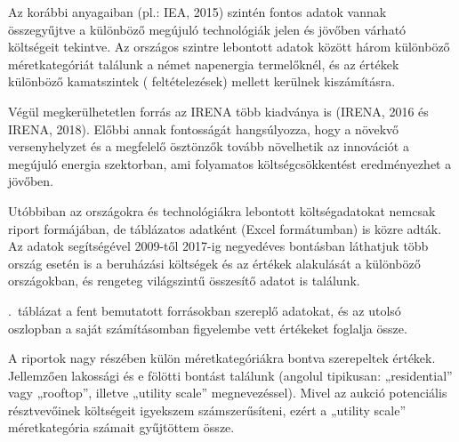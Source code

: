 \documentclass[twoside, magyar, showtrims]{corvinusphd}
\begin{document}
Az  korábbi anyagaiban (pl.: IEA, 2015)
szintén fontos adatok vannak összegyűjtve a különböző
megújuló technológiák jelen és jövőben várható költségeit tekintve.
Az országos szintre lebontott adatok között
három különböző méretkategóriát találunk a német napenergia termelőknél,
és az  értékek különböző kamatszintek 
( feltételezések) mellett kerülnek kiszámításra. 

Végül megkerülhetetlen forrás az IRENA több kiadványa is
(IRENA, 2016 és IRENA, 2018).
Előbbi annak fontosságát hangsúlyozza, hogy
a növekvő versenyhelyzet és a megfelelő ösztönzők
tovább növelhetik az innovációt a megújuló energia szektorban,
ami folyamatos költségcsökkentést eredményezhet a jövőben.

Utóbbiban az országokra és technológiákra lebontott
költségadatokat nemcsak riport formájában,
de táblázatos adatként (Excel formátumban) is közre adták.
Az adatok segítségével 2009-től 2017-ig
negyedéves bontásban láthatjuk több ország esetén is
a beruházási költségek és az 
értékek alakulását a különböző országokban,
és rengeteg világszintű összesítő adatot is találunk.

.~táblázat a fent bemutatott
forrásokban szereplő adatokat,  és az utolsó oszlopban a
saját számításomban figyelembe vett értékeket foglalja össze.

A riportok nagy részében külön méretkategóriákra bontva szerepeltek értékek. 
Jellemzően lakossági és e fölötti bontást találunk
(angolul tipikusan: „residential” vagy „rooftop”,
illetve „utility scale” megnevezéssel). 
Mivel az aukció potenciális résztvevőinek
költségeit igyekszem számszerűsíteni, ezért a „utility scale”
méretkategória számait gyűjtöttem össze.

\label{invcost}
\end{document}
